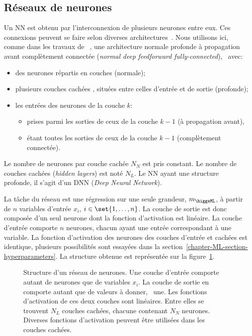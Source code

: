 \subsection{Réseaux de neurones}\label{chapter-ML-section-DNN-networks}
Un NN est obtenu par l'interconnexion de plusieurs neurones entre eux.
Ces connexions peuvent se faire selon diverses architectures~\cite{DNN}.
Nous utilisons ici,
comme dans les travaux de \citeauthor{BARTSCHI201929}~\cite{BARTSCHI201929},
une architecture
normale profonde à propagation avant complètement connectée (\emph{normal deep feedforward fully-connected}),
\ie\ avec:
\begin{itemize}
\item des neurones répartis en couches (normale);
\item plusieurs couches \og cachées \fg, situées entre celles d'entrée et de sortie (profonde);
\item les entrées des neurones de la couche $k$:
\begin{itemize}
\item prises parmi les sorties de ceux de la couche $k-1$ (à propagation avant),
\item étant toutes les sorties de ceux de la couche $k-1$ (complètement connectée).
\end{itemize}
\end{itemize}
Le nombre de neurones par couche cachée $N_N$ est pris constant.
Le nombre de couches cachées (\emph{hidden layers}) est noté $N_L$.
Le NN ayant une structure profonde, il s'agit d'un DNN (\emph{Deep Neural Network}).
\par
La tâche du réseau est une régression sur une seule grandeur, $m_{\higgsML}$, à partir de $n$ variables d'entrée $x_i$, $i\in\set{1,\ldots,n}$.
La couche de sortie est donc composée d'un seul neurone dont la fonction d'activation est linéaire.
La couche d'entrée comporte $n$ neurones, chacun ayant une entrée correspondant à une variable.
La fonction d'activation des neurones des couches d'entrée et cachées est identique, plusieurs possibilités sont essayées dans la section~\ref{chapter-ML-section-hyperparameters}.
La structure obtenue est représentée sur la figure~\ref{fig-neural_network_fr}.
\begin{figure}[h]
\centering

\caption[Structure d'un réseau de neurones.]{Structure d'un réseau de neurones. Une couche d'entrée comporte autant de neurones que de variables $x_i$. La couche de sortie en comporte autant que de valeurs à donner, \ie\ une. Les fonctions d'activation de ces deux couches sont linéaires. Entre elles se trouvent $N_L$ couches cachées, chacune contenant $N_N$ neurones. Diverses fonctions d'activation peuvent être utilisées dans les couches cachées.}
\label{fig-neural_network_fr}
\end{figure}